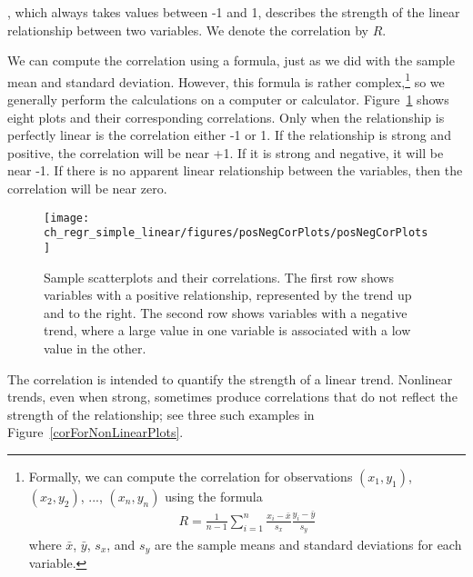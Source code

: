 \begin{termBox}{
, which always takes values between -1 and 1, describes the strength of the linear relationship between two variables. We denote the correlation by $R$.}
\end{termBox}

We can compute the correlation using a formula, just as we did with the sample mean and standard deviation. However, this formula is rather complex,\footnote{Formally, we can compute the correlation for observations $(x_1, y_1)$, $(x_2, y_2)$, ..., $(x_n, y_n)$ using the formula
\begin{eqnarray*}
R = \frac{1}{n-1}\sum_{i=1}^{n} \frac{x_i-\bar{x}}{s_x}\frac{y_i-\bar{y}}{s_y}
\end{eqnarray*}
where $\bar{x}$, $\bar{y}$, $s_x$, and $s_y$ are the sample means and standard deviations for each variable.} so we generally perform the calculations on a computer or calculator. Figure~\ref{posNegCorPlots} shows eight plots and their corresponding correlations. Only when the relationship is perfectly linear is the correlation either -1 or 1. If the relationship is strong and positive, the correlation will be near +1. If it is strong and negative, it will be near -1. If there is no apparent linear relationship between the variables, then the correlation will be near zero.

\begin{figure}
   \centering
   \texttt{[image: ch\_regr\_simple\_linear/figures/posNegCorPlots/posNegCorPlots]}
   \caption{Sample scatterplots and their correlations. The first row shows variables with a positive relationship, represented by the trend up and to the right. The second row shows variables with a negative trend, where a large value in one variable is associated with a low value in the other.}
   \label{posNegCorPlots}
\end{figure}

The correlation is intended to quantify the strength of a linear trend. Nonlinear trends, even when strong, sometimes produce correlations that do not reflect the strength of the relationship; see three such examples in Figure~\ref{corForNonLinearPlots}.

